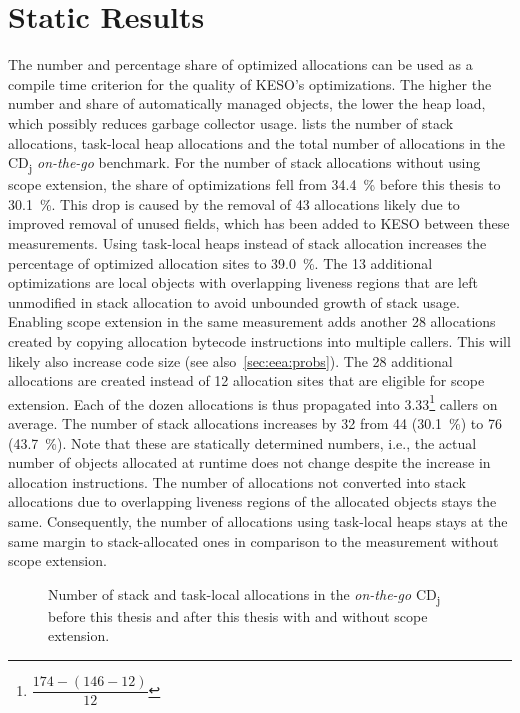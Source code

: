 	\section{Static Results}
		\label{sec:eval:static}
		The number and percentage share of optimized allocations can be used as a compile time criterion for the quality of
		KESO's optimizations. The higher the number and share of automatically managed objects, the lower the heap load,
		which possibly reduces garbage collector usage.  lists the number of stack
		allocations, task-local heap allocations and the total number of allocations in the CD\textsubscript{j}
		\emph{on-the-go} benchmark. For the number of stack allocations without using scope extension, the share of
		optimizations fell from 34.4~\% before this thesis to 30.1~\%. This drop is caused by the removal of 43 allocations
		likely due to improved removal of unused fields, which has been added to KESO between these measurements. Using
		task-local heaps instead of stack allocation increases the percentage of optimized allocation sites to 39.0~\%. The
		13 additional optimizations are local objects with overlapping liveness regions that are left unmodified in stack
		allocation to avoid unbounded growth of stack usage. Enabling scope extension in the same measurement adds another
		28 allocations created by copying allocation bytecode instructions into multiple callers. This will likely also
		increase code size (see also~\cref{sec:eea:probs}). The 28 additional allocations are created instead of 12
		allocation sites that are eligible for scope extension. Each of the dozen allocations is thus propagated into
		3.33\footnote{$\dfrac{174 - (146 - 12)}{12}$} callers on average. The number of stack allocations increases by 32
		from 44 (30.1~\%) to 76 (43.7~\%). Note that these are statically determined numbers, i.e., the actual number of
		objects allocated at runtime does not change despite the increase in allocation instructions. The number of
		allocations not converted into stack allocations due to overlapping liveness regions of the allocated objects stays
		the same. Consequently, the number of allocations using task-local heaps stays at the same margin to stack-allocated
		ones in comparison to the measurement without scope extension.

		\begin{figure}
			\centering
			

			\caption[Number of stack and task-local allocations in \emph{on-the-go} CD\textsubscript{j}]{%
				Number of stack and task-local allocations in the \emph{on-the-go} CD\textsubscript{j} before this thesis and
				after this thesis with and without scope extension.}
			\label{fig:eval:static:numallocs}
		\end{figure}

